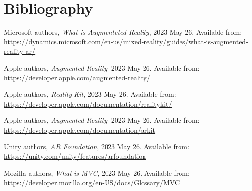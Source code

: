 \documentclass[a4paper,oneside]{article}
\begin{document}
\section{Bibliography}
\label{sec:irod-es-csatl}

\begin{thebibliography}{9}
  \label{sec:tanulm-irod-jegyz}

   Microsoft authors, \emph{What is Augmenteted Reality}, 2023 May 26.  Available
  from: \\ \url{https://dynamics.microsoft.com/en-us/mixed-reality/guides/what-is-augmented-reality-ar/}

   Apple authors, \emph{Augmented Reality}, 2023 May 26.  Available
  from: \\ \url{https://developer.apple.com/augmented-reality/}

   Apple authors, \emph{Reality Kit}, 2023 May 26.  Available
  from: \\ \url{https://developer.apple.com/documentation/realitykit/}

   Apple authors, \emph{Augmented Reality}, 2023 May 26.  Available
  from: \\ \url{https://developer.apple.com/documentation/arkit}

   Unity authors, \emph{AR Foundation}, 2023 May 26.  Available
  from: \\ \url{https://unity.com/unity/features/arfoundation}

   Mozilla authors, \emph{What is MVC}, 2023 May 26.  Available
  from: \\ \url{https://developer.mozilla.org/en-US/docs/Glossary/MVC}


\end{thebibliography}
\end{document}
